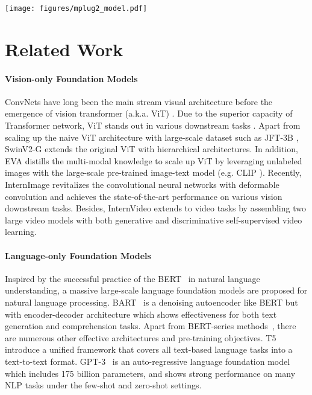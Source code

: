 \documentclass{article}
\theoremstyle{plain}
\theoremstyle{definition}
\theoremstyle{remark}
\newcommand{\modelname}{mPLUG-2 }
\begin{document}
\begin{figure*}
    \centering
    \texttt{[image: figures/mplug2\_model.pdf]}
\vspace{-2ex}
\caption{The overall framework and module details of \modelname.}
\vspace{-3ex}
\label{fig:model}
\end{figure*}

\vspace{-2ex}
\section{Related Work}
\paragraph{Vision-only Foundation Models}
ConvNets \citep{szegedy2017inception, He2015DeepRL} have long been the main stream visual architecture before the emergence of vision transformer (a.k.a. ViT) \citep{dosovitskiy2020image}. Due to the superior capacity of Transformer network, ViT stands out in various downstream tasks \citep{Nicolas2020DETR, Xu2022GroupViTSS}. Apart from scaling up the naive ViT architecture with large-scale dataset such as JFT-3B \citep{Zhai2021ScalingVT}, SwinV2-G \citep{Liu2021SwinTV} extends the original ViT with hierarchical architectures. 
In addition, EVA \citep{Fang2022EVA} distills the multi-modal knowledge to scale up ViT by leveraging unlabeled images with the large-scale pre-trained image-text model (e.g. CLIP \citep{radford2021learning}). Recently, InternImage \citep{Wang2022InternImageEL} revitalizes the convolutional neural networks with deformable convolution and achieves the state-of-the-art performance on various vision downstream tasks. Besides, InternVideo \citep{Wang2022InternVideoGV} extends to video tasks by assembling two large video models with both generative and discriminative self-supervised video learning.

\vspace{-2ex}
\paragraph{Language-only Foundation Models}
Inspired by the successful practice of the BERT~\citep{devlin2018bert} in natural language understanding, a massive large-scale language foundation models are proposed for natural language processing.
BART~\citep{Mike2020BART} is a denoising autoencoder like BERT but with encoder-decoder architecture which shows effectiveness for both text generation and comprehension tasks.
Apart from BERT-series methods~\citep{devlin2018bert, Mike2020BART, liu2019roberta}, there are numerous other effective architectures and pre-training objectives. 
T5~\citep{Colin2020T5} introduce a unified framework that covers all text-based language tasks into a text-to-text format.
GPT-3~\citep{Tom2020GPT3} is an auto-regressive language foundation model which includes 175 billion parameters, and shows strong performance on many NLP tasks under the few-shot and zero-shot settings.
\end{document}
